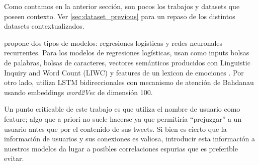 Como contamos en la anterior sección, son pocos los trabajos y datasets que poseen contexto. Ver \ref{sec:dataset_previous} para un repaso de los distintos datasets contextualizados.

\citet{gao-huang-2017-detecting} propone dos tipos de modelos: regresiones logísticas y redes neuronales recurrentes. Para los modelos de regresiones logísticas, usan como inputs bolsas de palabras, bolsas de caracteres, vectores semánticos producidos con Linguistic Inquiry and Word Count (LIWC) \cite{pennebaker2001linguistic} y features de un lexicon de emociones \cite{mohammad2013nrc}. Por otro lado, utiliza LSTM bidireccionales con mecanismo de atención de Bahdanau \cite{bahdanau2014neural} usando embeddings \emph{word2Vec} de dimensión 100.

Un punto criticable de este trabajo es que utiliza el nombre de usuario como feature; algo que a priori no suele hacerse ya que permitiría ``prejuzgar'' a un usuario antes que por el contenido de sus tweets. Si bien es cierto que la información de usuarios y sus conexiones es valiosa, introducir esta información a nuestros modelos da lugar a posibles correlaciones espurias que es preferible evitar.


